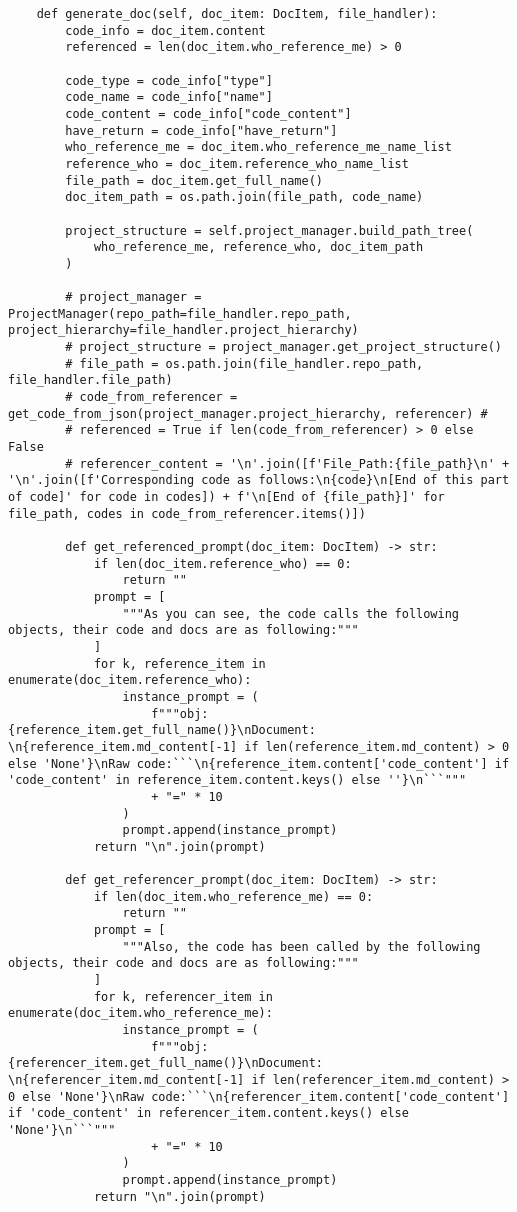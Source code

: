 \begin{verbatim}
    def generate_doc(self, doc_item: DocItem, file_handler):
        code_info = doc_item.content
        referenced = len(doc_item.who_reference_me) > 0

        code_type = code_info["type"]
        code_name = code_info["name"]
        code_content = code_info["code_content"]
        have_return = code_info["have_return"]
        who_reference_me = doc_item.who_reference_me_name_list
        reference_who = doc_item.reference_who_name_list
        file_path = doc_item.get_full_name()
        doc_item_path = os.path.join(file_path, code_name)

        project_structure = self.project_manager.build_path_tree(
            who_reference_me, reference_who, doc_item_path
        )

        # project_manager = ProjectManager(repo_path=file_handler.repo_path, project_hierarchy=file_handler.project_hierarchy)
        # project_structure = project_manager.get_project_structure()
        # file_path = os.path.join(file_handler.repo_path, file_handler.file_path)
        # code_from_referencer = get_code_from_json(project_manager.project_hierarchy, referencer) #
        # referenced = True if len(code_from_referencer) > 0 else False
        # referencer_content = '\n'.join([f'File_Path:{file_path}\n' + '\n'.join([f'Corresponding code as follows:\n{code}\n[End of this part of code]' for code in codes]) + f'\n[End of {file_path}]' for file_path, codes in code_from_referencer.items()])

        def get_referenced_prompt(doc_item: DocItem) -> str:
            if len(doc_item.reference_who) == 0:
                return ""
            prompt = [
                """As you can see, the code calls the following objects, their code and docs are as following:"""
            ]
            for k, reference_item in enumerate(doc_item.reference_who):
                instance_prompt = (
                    f"""obj: {reference_item.get_full_name()}\nDocument: \n{reference_item.md_content[-1] if len(reference_item.md_content) > 0 else 'None'}\nRaw code:```\n{reference_item.content['code_content'] if 'code_content' in reference_item.content.keys() else ''}\n```"""
                    + "=" * 10
                )
                prompt.append(instance_prompt)
            return "\n".join(prompt)

        def get_referencer_prompt(doc_item: DocItem) -> str:
            if len(doc_item.who_reference_me) == 0:
                return ""
            prompt = [
                """Also, the code has been called by the following objects, their code and docs are as following:"""
            ]
            for k, referencer_item in enumerate(doc_item.who_reference_me):
                instance_prompt = (
                    f"""obj: {referencer_item.get_full_name()}\nDocument: \n{referencer_item.md_content[-1] if len(referencer_item.md_content) > 0 else 'None'}\nRaw code:```\n{referencer_item.content['code_content'] if 'code_content' in referencer_item.content.keys() else 'None'}\n```"""
                    + "=" * 10
                )
                prompt.append(instance_prompt)
            return "\n".join(prompt)


\end{verbatim}
